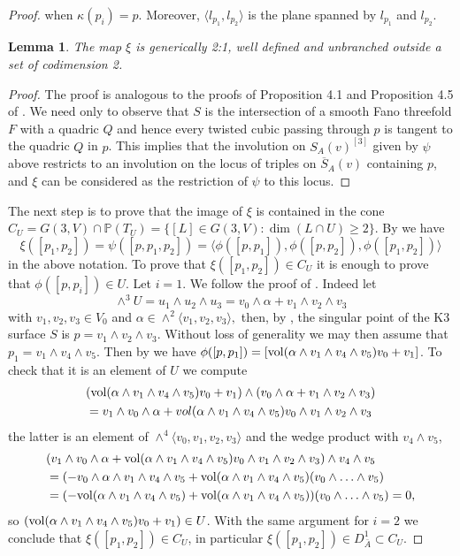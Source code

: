 \documentclass[a4paper,11pt]{amsart}
\newtheorem{lem}[thm]{Lemma}
\theoremstyle{definition}
\numberwithin{equation}{section}
\numberwithin{equation}{section} \theoremstyle{definition}
\begin{document}
\begin{proof}
  when $\kappa (p_i)=p$. 
 Moreover, $\langle l_{p_1},l_{p_2}\rangle$ is the plane spanned by $l_{p_1}$ and $l_{p_2}$.
 \begin{lem}The map $\xi$ is generically 2:1, well defined and unbranched outside a set of codimension 2.   
 \end{lem}
 \medskip
\begin{proof} The proof is analogous to the proofs of Proposition 4.1 and Proposition 4.5 of \cite{EPWcubes}. We need only to observe that $S$ is the intersection of a smooth Fano threefold $F$ with a quadric $Q$ and hence every twisted cubic passing through $p$ is tangent to the quadric $Q$ in $p$. This implies that the involution on $S_A(v)^{[3]}$ given by $\psi$ above restricts to an involution  on the locus of triples on $\overline{S}_A(v)$ containing $p$, and  $\xi$ can be considered as the restriction of $\psi$ to this locus.
\end{proof}
 The next step is to prove that the image of $\xi$ is contained in the cone $C_U=G(3,V) \cap \mathbb{P}(T_U)=\{[L]\in G(3,V): \dim (L\cap U)\geq 2\}$. By \cite[Lemma 4.2]{EPWcubes} we have 
 $$\xi([p_1,p_2])=\psi([p,p_1,p_2])=\langle\phi([p,p_1]),\phi([p,p_2]),\phi([p_1,p_2])\rangle$$ in the above notation. 
 To prove that  $\xi([p_1,p_2])\in C_U$ it is enough to prove that $\phi([p,p_i])\in U$. Let $i=1$.
 We follow the proof of \cite[Proposition 4.1]{EPWcubes}. Indeed let 
 \[
 \wedge^3 U=u_1\wedge u_2 \wedge u_3= v_0\wedge \alpha + v_1\wedge v_2 \wedge v_3 
 \]
  with $v_1,v_2,v_3\in V_0$ and $\alpha\in \wedge^2 \langle v_1,v_2,v_3\rangle,$
  then, by \cite[Corollary~4.7]{Ogrady-michigan}, the singular point of the K3 surface $S$ is $p=v_1\wedge v_2 \wedge v_3$. Without loss of generality we may then assume that $p_1=v_1\wedge v_4\wedge v_5$. 
 Then by \cite[Equation 4.1]{EPWcubes} we have 
 $\phi([p,p_1])=[{\rm vol}(\alpha \wedge v_1\wedge v_4\wedge v_5)v_0+v_1]$. To check that it is an element of $U$ 
 we compute 
\begin{align*}
&( {\rm vol}(\alpha \wedge v_1\wedge v_4\wedge v_5)v_0+v_1)\wedge (v_0\wedge \alpha + v_1\wedge v_2 \wedge v_3)\\
&=v_1\wedge v_0 \wedge \alpha +vol(\alpha \wedge v_1\wedge v_4\wedge v_5) v_0\wedge v_1\wedge v_2 \wedge v_3
\end{align*}
the latter is an element of $\wedge^4\langle v_0,v_1,v_2,v_3\rangle$ and  the wedge product with $v_4\wedge v_5$,
\begin{align*}
&(v_1\wedge v_0 \wedge \alpha +{\rm vol}(\alpha \wedge v_1\wedge v_4\wedge v_5) v_0\wedge v_1\wedge v_2 \wedge v_3)\wedge v_4\wedge v_5\\
&=(-v_0 \wedge \alpha\wedge v_1\wedge v_4\wedge v_5+{\rm vol}(\alpha \wedge v_1\wedge v_4\wedge v_5)(v_0\wedge \ldots\wedge v_5)\\
&=(-{\rm vol}(\alpha \wedge v_1\wedge v_4\wedge v_5)+{\rm vol}(\alpha \wedge v_1\wedge v_4\wedge v_5))(v_0\wedge \ldots\wedge v_5)=0,
\end{align*}
so $({\rm vol}(\alpha \wedge v_1\wedge v_4\wedge v_5)v_0+v_1)\in U$.  With the same argument for $i=2$ we conclude that  $\xi([p_1,p_2])\in C_U$, in particular 
$\xi([p_1,p_2])\in D^1_{\bar{A}} \subset C_U$. 


\end{proof}
\end{document}

